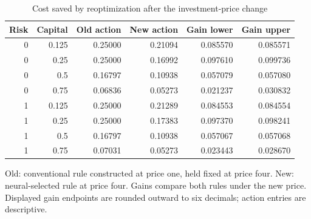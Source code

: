 \begin{table}[htbp]
\centering\small\setlength{\tabcolsep}{5pt}
\caption{Cost saved by reoptimization after the investment-price change}\label{tab:r39economic}
\begin{tabular}{rrrrrr}
\toprule
Risk & Capital & Old action & New action & Gain lower & Gain upper\\
\midrule
0 & 0.125 & 0.25000 & 0.21094 & 0.085570 & 0.085571\\
0 & 0.25 & 0.25000 & 0.16992 & 0.097610 & 0.099736\\
0 & 0.5 & 0.16797 & 0.10938 & 0.057079 & 0.057080\\
0 & 0.75 & 0.06836 & 0.05273 & 0.021237 & 0.030832\\
1 & 0.125 & 0.25000 & 0.21289 & 0.084553 & 0.084554\\
1 & 0.25 & 0.25000 & 0.17383 & 0.097370 & 0.098241\\
1 & 0.5 & 0.16797 & 0.10938 & 0.057067 & 0.057068\\
1 & 0.75 & 0.07031 & 0.05273 & 0.023443 & 0.028670\\
\bottomrule
\end{tabular}
\par\smallskip\begin{minipage}{.96\linewidth}\footnotesize Old: conventional rule constructed at price one, held fixed at price four. New: neural-selected rule at price four. Gains compare both rules under the new price. Displayed gain endpoints are rounded outward to six decimals; action entries are descriptive.\end{minipage}
\end{table}
